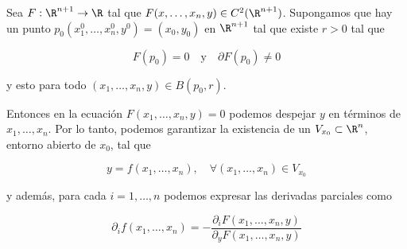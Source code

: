 \begin{teo}
    Sea $F: \R^{n+1} \rightarrow \R$ tal que $F(x, \dots, x_n, y) \in C^2(\R^{n+1})$. Supongamos que hay un punto $p_0(x_1^0, \dots, x_n^0, y^0) = (x_0, y_0)$ en $\R^{n+1}$ tal que existe $r > 0$ tal que
    
    \[
    F(p_0) = 0 \quad \text{y} \quad \partial F(p_0) \neq 0
    \]
    
    \noindent y esto para todo $(x_1, \dots, x_n, y) \in B(p_0, r)$.
    
    Entonces en la ecuación $F(x_1, \dots, x_n, y) = 0$ podemos despejar $y$ en términos de $x_1, \dots, x_n$. Por lo tanto, podemos garantizar la existencia de un $V_{x_0} \subset \R^n $, entorno abierto de $x_0$, tal que
    
    \[
    y = f(x_1, \dots, x_n), \quad \forall (x_1, \dots, x_n) \in V_{x_0}
    \]
    
    \noindent y además, para cada $i = 1, \dots, n$ podemos expresar las derivadas parciales como
    
    \[
    \partial_i f(x_1, \dots, x_n) = - \dfrac{\partial_i F(x_1, \dots, x_n, y)}{\partial_y F(x_1, \dots, x_n, y)}
    \]
\end{teo}

